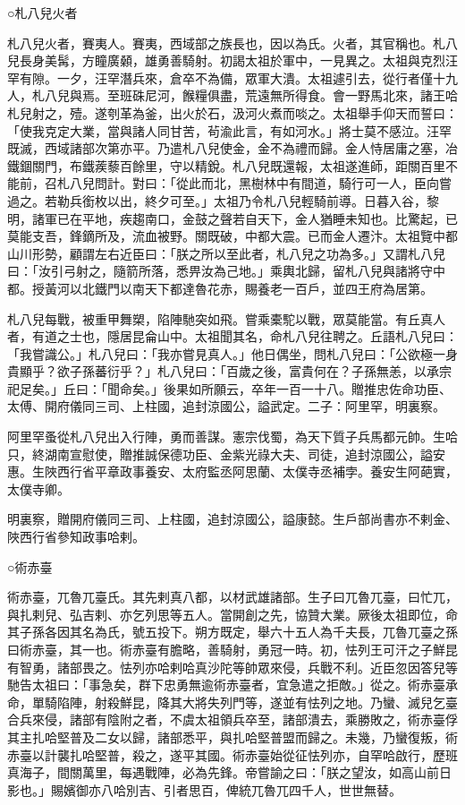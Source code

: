 \begin{pinyinscope}
 ○札八兒火者



 札八兒火者，賽夷人。賽夷，西域部之族長也，因以為氏。火者，其官稱也。札八兒長身美髯，方瞳廣顙，雄勇善騎射。初謁太祖於軍中，一見異之。太祖與克烈汪罕有隙。一夕，汪罕潛兵來，倉卒不為備，眾軍大潰。太祖遽引去，從行者僅十九人，札八兒與焉。至班硃尼河，餱糧俱盡，荒遠無所得食。會一野馬北來，諸王哈札兒射之，殪。遂刳革為釜，出火於石，汲河火煮而啖之。太祖舉手仰天而誓曰：「使我克定大業，當與諸人同甘苦，茍渝此言，有如河水。」將士莫不感泣。汪罕既滅，西域諸部次第亦平。乃遣札八兒使金，金不為禮而歸。金人恃居庸之塞，冶鐵錮關門，布鐵蒺藜百餘里，守以精銳。札八兒既還報，太祖遂進師，距關百里不能前，召札八兒問計。對曰：「從此而北，黑樹林中有間道，騎行可一人，臣向嘗過之。若勒兵銜枚以出，終夕可至。」太祖乃令札八兒輕騎前導。日暮入谷，黎明，諸軍已在平地，疾趨南口，金鼓之聲若自天下，金人猶睡未知也。比驚起，已莫能支吾，鋒鏑所及，流血被野。關既破，中都大震。已而金人遷汴。太祖覽中都山川形勢，顧謂左右近臣曰：「朕之所以至此者，札八兒之功為多。」又謂札八兒曰：「汝引弓射之，隨箭所落，悉畀汝為己地。」乘輿北歸，留札八兒與諸將守中都。授黃河以北鐵門以南天下都達魯花赤，賜養老一百戶，並四王府為居第。



 札八兒每戰，被重甲舞槊，陷陣馳突如飛。嘗乘橐駝以戰，眾莫能當。有丘真人者，有道之士也，隱居昆侖山中。太祖聞其名，命札八兒往聘之。丘語札八兒曰：「我嘗識公。」札八兒曰：「我亦嘗見真人。」他日偶坐，問札八兒曰：「公欲極一身貴顯乎？欲子孫蕃衍乎？」札八兒曰：「百歲之後，富貴何在？子孫無恙，以承宗祀足矣。」丘曰：「聞命矣。」後果如所願云，卒年一百一十八。贈推忠佐命功臣、太傅、開府儀同三司、上柱國，追封涼國公，謚武定。二子：阿里罕，明裏察。



 阿里罕蚤從札八兒出入行陣，勇而善謀。憲宗伐蜀，為天下質子兵馬都元帥。生哈只，終湖南宣慰使，贈推誠保德功臣、金紫光祿大夫、司徒，追封涼國公，謚安惠。生陜西行省平章政事養安、太府監丞阿思蘭、太僕寺丞補孛。養安生阿葩實，太僕寺卿。



 明裏察，贈開府儀同三司、上柱國，追封涼國公，謚康懿。生戶部尚書亦不剌金、陜西行省參知政事哈剌。



 ○術赤臺



 術赤臺，兀魯兀臺氏。其先剌真八都，以材武雄諸部。生子曰兀魯兀臺，曰忙兀，與扎剌兒、弘吉剌、亦乞列思等五人。當開創之先，協贊大業。厥後太祖即位，命其子孫各因其名為氏，號五投下。朔方既定，舉六十五人為千夫長，兀魯兀臺之孫曰術赤臺，其一也。術赤臺有膽略，善騎射，勇冠一時。初，怯列王可汗之子鮮昆有智勇，諸部畏之。怯列亦哈剌哈真沙陀等帥眾來侵，兵戰不利。近臣忽因答兒等馳告太祖曰：「事急矣，群下忠勇無逾術赤臺者，宜急遣之拒敵。」從之。術赤臺承命，單騎陷陣，射殺鮮昆，降其大將失列門等，遂並有怯列之地。乃蠻、滅兒乞臺合兵來侵，諸部有陰附之者，不虞太祖領兵卒至，諸部潰去，乘勝敗之，術赤臺俘其主扎哈堅普及二女以歸，諸部悉平，與扎哈堅普盟而歸之。未幾，乃蠻復叛，術赤臺以計襲扎哈堅普，殺之，遂平其國。術赤臺始從征怯列亦，自罕哈啟行，歷班真海子，間關萬里，每遇戰陣，必為先鋒。帝嘗諭之曰：「朕之望汝，如高山前日影也。」賜嬪御亦八哈別吉、引者思百，俾統兀魯兀四千人，世世無替。




\end{pinyinscope}

